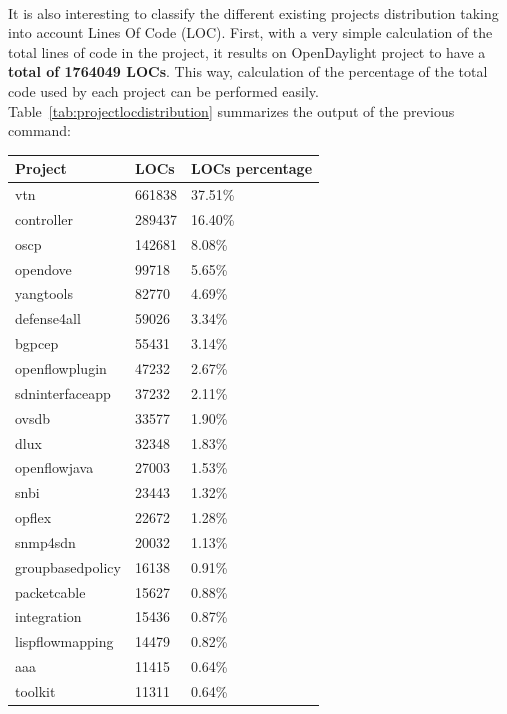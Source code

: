 \documentclass[a4paper, 12pt]{book}
\begin{document}
\\
It is also interesting to classify the different existing projects distribution taking into account Lines Of Code (LOC). First, with a very simple calculation of the total lines of code in the project, it results on OpenDaylight project to have a \textbf{total of 1764049 LOCs}. This way, calculation of the percentage of the total code used by each project can be performed easily. Table~\ref{tab:projectlocdistribution} summarizes the output of the previous command:
\begin{table}
\footnotesize
\begin{center}
\begin{tabular}{|l|l|l|}
\hline
\textbf{Project} & \textbf{LOCs} & \textbf{LOCs percentage} \\ \hline
vtn               & 661838 & 37.51\% \\ \hline
controller        & 289437 & 16.40\% \\ \hline
oscp              & 142681 &  8.08\% \\ \hline
opendove          & 99718  &  5.65\% \\ \hline
yangtools         & 82770  &  4.69\% \\ \hline
defense4all       & 59026  &  3.34\% \\ \hline
bgpcep            & 55431  &  3.14\% \\ \hline
openflowplugin    & 47232  &  2.67\% \\ \hline
sdninterfaceapp   & 37232  &  2.11\% \\ \hline
ovsdb             & 33577  &  1.90\% \\ \hline
dlux              & 32348  &  1.83\% \\ \hline
openflowjava      & 27003  &  1.53\% \\ \hline
snbi              & 23443  &  1.32\% \\ \hline
opflex            & 22672  &  1.28\% \\ \hline
snmp4sdn          & 20032  &  1.13\% \\ \hline
groupbasedpolicy  & 16138  &  0.91\% \\ \hline
packetcable       & 15627  &  0.88\% \\ \hline
integration       & 15436  &  0.87\% \\ \hline
lispflowmapping   & 14479  &  0.82\% \\ \hline
aaa               & 11415  &  0.64\% \\ \hline
toolkit           & 11311  &  0.64\% \\ \hline

\end{tabular}
\end{center}
\end{table}
\end{document}
